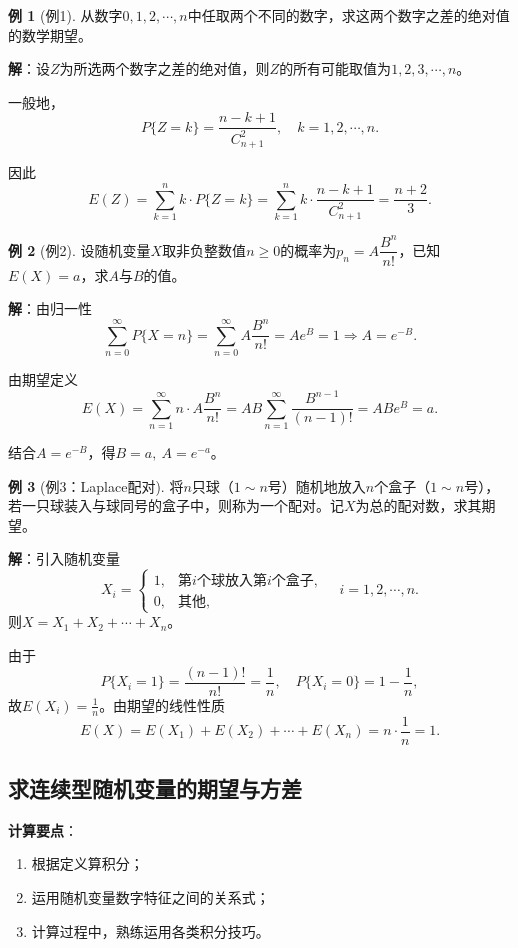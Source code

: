 \documentclass[11pt,a4paper]{report}
\theoremstyle{definition}
\newtheorem{example}{例}[chapter]
\theoremstyle{plain}
\begin{document}
\begin{example}[例1]
从数字$0,1,2,\cdots,n$中任取两个不同的数字，求这两个数字之差的绝对值的数学期望。

\textbf{解}：设$Z$为所选两个数字之差的绝对值，则$Z$的所有可能取值为$1,2,3,\cdots,n$。

一般地，
\[
P\{Z=k\}=\frac{n-k+1}{C_{n+1}^2},\quad k=1,2,\cdots,n.
\]

因此
\[
E(Z)=\sum_{k=1}^{n}k\cdot P\{Z=k\}
=\sum_{k=1}^{n}k\cdot\frac{n-k+1}{C_{n+1}^2}
=\frac{n+2}{3}.
\]
\end{example}

\begin{example}[例2]
设随机变量$X$取非负整数值$n\geq 0$的概率为$p_n=A\dfrac{B^n}{n!}$，已知$E(X)=a$，求$A$与$B$的值。

\textbf{解}：由归一性
\[
\sum_{n=0}^{\infty}P\{X=n\}=\sum_{n=0}^{\infty}A\frac{B^n}{n!}=Ae^B=1
\Rightarrow A=e^{-B}.
\]

由期望定义
\[
E(X)=\sum_{n=1}^{\infty}n\cdot A\frac{B^n}{n!}
=AB\sum_{n=1}^{\infty}\frac{B^{n-1}}{(n-1)!}
=ABe^B=a.
\]

结合$A=e^{-B}$，得$B=a,\ A=e^{-a}$。
\end{example}

\begin{example}[例3：Laplace配对]
将$n$只球（$1\sim n$号）随机地放入$n$个盒子（$1\sim n$号），若一只球装入与球同号的盒子中，则称为一个配对。记$X$为总的配对数，求其期望。

\textbf{解}：引入随机变量
\[
X_i=\begin{cases}
1, & \text{第}i\text{个球放入第}i\text{个盒子},\\
0, & \text{其他},
\end{cases}
\quad i=1,2,\cdots,n.
\]
则$X=X_1+X_2+\cdots+X_n$。

由于
\[
P\{X_i=1\}=\frac{(n-1)!}{n!}=\frac{1}{n},\quad
P\{X_i=0\}=1-\frac{1}{n},
\]
故$E(X_i)=\frac{1}{n}$。由期望的线性性质
\[
E(X)=E(X_1)+E(X_2)+\cdots+E(X_n)=n\cdot\frac{1}{n}=1.
\]
\end{example}

\subsection{求连续型随机变量的期望与方差}

\textbf{计算要点}：
\begin{enumerate}[label=\arabic*.,leftmargin=2em]
    \item 根据定义算积分；
    \item 运用随机变量数字特征之间的关系式；
    \item 计算过程中，熟练运用各类积分技巧。
\end{enumerate}
\end{document}
